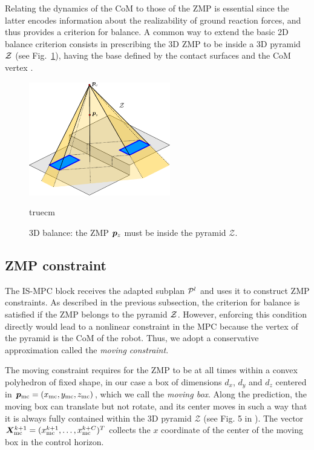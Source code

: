Relating the dynamics of the CoM to those of the ZMP is essential since the latter encodes information about the realizability of ground reaction forces, and thus provides a criterion for balance. 
A common way to extend the basic 2D balance criterion consists in prescribing the 3D ZMP to be inside a 3D pyramid $\cal Z$ (see Fig.~\ref{fig:FAPA:balance3D}), having the base defined by the contact surfaces and the CoM vertex \cite{Sugihara2002ICRA, Cipriano2023RAS}.

\begin{figure}
    \centering
    \includegraphics[width=0.55\textwidth]{figures/balance3d.pdf}
    \caption{3D balance: the ZMP ${\bm{p}}_z$ must be inside the pyramid $\mathcal{Z}$.}
    \label{fig:FAPA:balance3D}
     truecm
\end{figure}

\subsection{ZMP constraint}

The IS-MPC block receives the adapted subplan ${\cal P}^l$ and uses it to construct ZMP constraints. As described in the previous subsection, the criterion for balance is satisfied if the ZMP belongs to the pyramid $\cal Z$. However, enforcing this condition directly would lead to a nonlinear constraint in the MPC because the vertex of the pyramid is the CoM of the robot. Thus, we adopt a conservative approximation called the {\em moving constraint}.

The moving constraint requires for the ZMP to be at all times within a convex polyhedron of fixed shape, in our case a box of dimensions $d_x$, $d_y$ and $d_z$ centered in ${\bm{p}}_{\rm mc}=(x_{\rm mc}, y_{\rm mc}, z_{\rm mc})$, which we call the {\em moving box}. Along the prediction, the moving box can translate but not rotate, and its center moves in such a way that it is always fully contained within the 3D pyramid $\mathcal{Z}$ (see Fig. 5 in \cite{ZaScLaOr:18}). The vector $\bm{X}_{\rm mc}^{k+1} = (x_{\rm mc}^{k+1}, \dots, x_{\rm mc}^{k+C})^T$ collects the $x$ coordinate of the center of the moving box in the control horizon.

